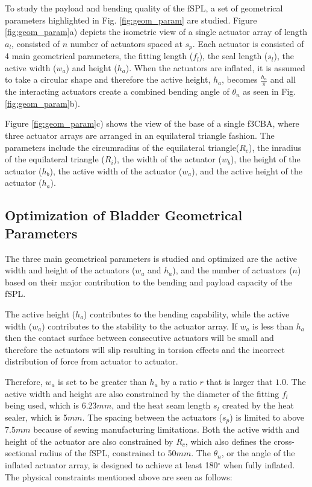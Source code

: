 \documentclass[letterpaper, 10 pt, conference]{ieeeconf}  %
\begin{document}
To study the payload and bending quality of the fSPL, a set of geometrical parameters highlighted in Fig. \ref{fig:geom_param} are studied. Figure \ref{fig:geom_param}a) depicts the isometric view of a single  actuator array of length $a_{l}$, consisted of $n$ number of actuators spaced at $s_{p}$. Each actuator is consisted of 4 main geometrical parameters, the fitting length ($f_{l}$), the seal length ($s_{l}$), the active width ($w_{a}$) and height ($h_{a}$). When the actuators are inflated, it is assumed to take a circular shape and therefore the active height, $h_{a}$, becomes $\frac{h_a}{\pi}$ and all the interacting actuators create a combined bending angle of $\theta_{n}$ as seen in Fig. \ref{fig:geom_param}b). 

Figure \ref{fig:geom_param}c) shows the view of the base of a single f3CBA, where three  actuator arrays are arranged in an equilateral triangle fashion. The parameters include the circumradius of the equilateral triangle($R_{c}$), the inradius of the equilateral triangle ($R_{i}$), the width of the actuator ($w_{b}$), the height of the actuator ($h_{b}$), the active width of the actuator ($w_{a}$), and the active height of the actuator ($h_{a}$). 


\subsection{Optimization of Bladder Geometrical Parameters}
The three main geometrical parameters is studied and optimized are the active width and height of the actuators ($w_{a}$ and $h_{a}$), and the number of actuators ($n$) based on their major contribution to the bending and payload capacity of the fSPL.

The active height ($h_{a}$) contributes to the bending capability, while the active width ($w_{a}$) contributes to the stability to the actuator array. If $w_{a}$ is less than $h_{a}$ then the contact surface between consecutive actuators will be small and therefore the actuators will slip resulting in torsion effects and the incorrect distribution of force from actuator to actuator.

Therefore, $w_a$ is set to be greater than $h_a$ by a ratio $r$ that is larger that $1.0$. The active width and height are also constrained by the diameter of the fitting $f_l$ being used, which is 6.23$mm$, and the heat seam length $s_l$ created by the heat sealer, which is 5$mm$. The spacing between the actuators ($s_{p}$) is limited to above $7.5mm$ because of sewing manufacturing limitations. Both the active width and height of the actuator are also constrained by $R_{c}$, which also defines the cross-sectional radius of the fSPL, constrained to 50$mm$. The $\theta_{n}$, or the angle of the inflated  actuator array, is designed to achieve at least 180$^{\circ}$ when fully inflated. The physical constraints mentioned above are seen as follows:
\end{document}
